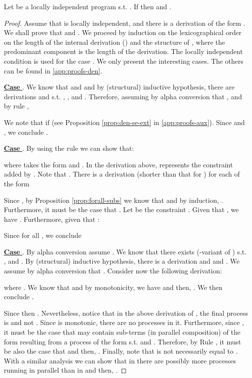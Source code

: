 \documentclass{tlp}
\begin{document}
\begin{lemma}[Completeness]\label{theo:comp}
Let   be a locally independent program s.t. . If  then  and 
. 
\end{lemma}
\begin{proof} 
Assume that    is locally independent,  and there is a derivation of the form  . We shall prove that  and
. 
	We proceed by induction on the lexicographical order on the length of the internal derivation  ()  and the structure of  , where the predominant component is the length of the derivation. 
 The locally independent condition is used for the case . We only present the interesting cases. The others can be found in \ref{app:proofs-den}. 


\noindent \underline{{\bf Case}  }. We know that  and  and by (structural) inductive hypothesis,  there are derivations   and  s.t.  ,  ,  and . Therefore,
assuming by alpha conversion that , 
  and by  rule , 


We note that   if  (see Proposition \ref{prop:den-se-ext} in \ref{app:proofs-aux}). Since 
and ,  we conclude .






\noindent \underline{{\bf Case}  }.   
By using the rule  we can show that:
	 
where  takes the form 
 and .
In the derivation above,   represents the constraint  added by  . Note that  .  There is a derivation (shorter than that for ) for each  of the form

Since , by Proposition \ref{prop:forall-subs} we know that   and by induction,  . Furthermore,   it must be the case that . 
Let  be the constraint .  Given that , we have . Furthermore, given that  :

Since  
for all ,   we conclude 





	  








\noindent \underline{{\bf Case}  }. By alpha conversion assume . We know that there exists  (-variant of ) s.t. ,  and  . By (structural) inductive hypothesis, there is a derivation 
 and 
 and 
. We assume by alpha conversion that . Consider now the following  derivation:

where .  We know that  and by monotonicity, we have  and then,  . We then conclude  .

Since   then . Nevertheless, notice that in the above derivation of , the final process is  and not . Since  is monotonic, there are no  processes in it. Furthermore, since , it must be the case that  may contain sub-terms (in parallel composition) of the form   resulting from  a process of the form  s.t.  and . 
 Therefore, 
by Rule , it must be also the case that  and then,  . Finally, note that  is not necessarily equal to . With a  similar analysis
 we can show that in  there are possibly more  processes running in parallel than in  and then,  .
\end{proof}
\end{document}
